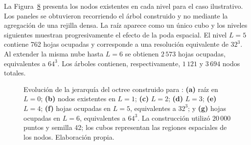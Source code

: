 La Figura~\ref{fig:jerarquia} presenta los nodos existentes en cada nivel para el caso ilustrativo. Los paneles se obtuvieron recorriendo el árbol construido y no mediante la agregación de una rejilla densa. La raíz aparece como un único cubo y los niveles siguientes muestran progresivamente el efecto de la poda espacial. El nivel $L=5$ contiene 762 hojas ocupadas y corresponde a una resolución equivalente de $32^3$. Al extender la misma nube hasta $L=6$ se obtienen $2\,573$ hojas ocupadas, equivalentes a $64^3$. Los árboles contienen, respectivamente, $1\,121$ y $3\,694$ nodos totales.
\begin{figure}[htbp]
\centering
\begin{subfigure}[t]{.31\textwidth}
\centering
{}
\caption{}\label{fig:jerarquia-nivel0}
\end{subfigure}
\hfill
\begin{subfigure}[t]{.31\textwidth}
\centering
{}
\caption{}\label{fig:jerarquia-nivel1}
\end{subfigure}
\hfill
\begin{subfigure}[t]{.31\textwidth}
\centering
{}
\caption{}\label{fig:jerarquia-nivel2}
\end{subfigure}
\par\medskip
\begin{subfigure}[t]{.31\textwidth}
\centering
{}
\caption{}\label{fig:jerarquia-nivel3}
\end{subfigure}
\hfill
\begin{subfigure}[t]{.31\textwidth}
\centering
{}
\caption{}\label{fig:jerarquia-nivel4}
\end{subfigure}
\hfill
\begin{subfigure}[t]{.31\textwidth}
\centering
{}
\caption{}\label{fig:jerarquia-nivel5}
\end{subfigure}
\par\medskip
\begin{subfigure}[t]{.31\textwidth}
\centering
{}
\caption{}\label{fig:jerarquia-nivel6}
\end{subfigure}
\caption{Evolución de la jerarquía del octree construido para \protect{}: \textbf{(a)} raíz en $L=0$; \textbf{(b)} nodos existentes en $L=1$; \textbf{(c)} $L=2$; \textbf{(d)} $L=3$; \textbf{(e)} $L=4$; \textbf{(f)} hojas ocupadas en $L=5$, equivalentes a $32^3$; y \textbf{(g)} hojas ocupadas en $L=6$, equivalentes a $64^3$. La construcción utilizó $20\,000$ puntos y semilla 42; los cubos representan las regiones espaciales de los nodos. Elaboración propia.}
\label{fig:jerarquia}
\end{figure}

